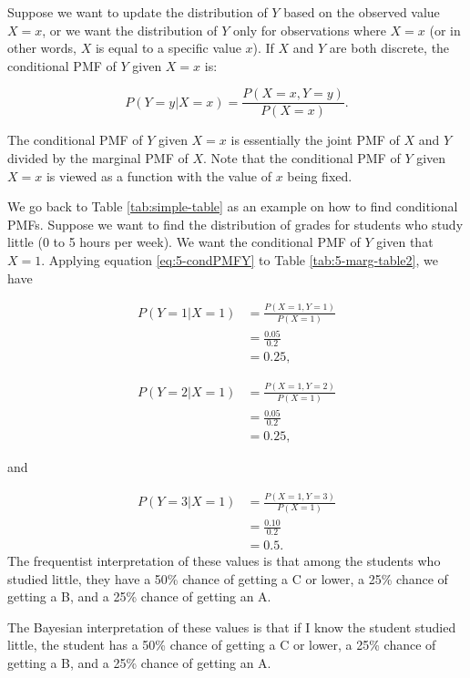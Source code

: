 \documentclass[
]{book}
\begin{document}
Suppose we want to update the distribution of \(Y\) based on the observed value \(X=x\), or we want the distribution of \(Y\) only for observations where \(X=x\) (or in other words, \(X\) is equal to a specific value \(x\)). If \(X\) and \(Y\) are both discrete, the conditional PMF of \(Y\) given \(X=x\) is:

\begin{equation} 
P(Y=y|X=x) = \frac{P(X=x, Y=y)}{P(X=x)}.
\label{eq:5-condPMFY}
\end{equation}

The conditional PMF of \(Y\) given \(X=x\) is essentially the joint PMF of \(X\) and \(Y\) divided by the marginal PMF of \(X\). Note that the conditional PMF of \(Y\) given \(X=x\) is viewed as a function with the value of \(x\) being fixed.

We go back to Table \ref{tab:simple-table} as an example on how to find conditional PMFs. Suppose we want to find the distribution of grades for students who study little (0 to 5 hours per week). We want the conditional PMF of \(Y\) given that \(X=1\). Applying equation \eqref{eq:5-condPMFY} to Table \ref{tab:5-marg-table2}, we have

\[
\begin{split}
P(Y=1|X=1) &= \frac{P(X=1, Y=1)}{P(X=1)}\\
 &= \frac{0.05}{0.2} \\
&= 0.25,
\end{split}
\]

\[
\begin{split}
P(Y=2|X=1) &= \frac{P(X=1, Y=2)}{P(X=1)}\\
 &= \frac{0.05}{0.2} \\
&= 0.25,
\end{split}
\]

and

\[
\begin{split}
P(Y=3|X=1) &= \frac{P(X=1, Y=3)}{P(X=1)}\\
 &= \frac{0.10}{0.2} \\
&= 0.5.
\end{split}
\]
The frequentist interpretation of these values is that among the students who studied little, they have a 50\% chance of getting a C or lower, a 25\% chance of getting a B, and a 25\% chance of getting an A.

The Bayesian interpretation of these values is that if I know the student studied little, the student has a 50\% chance of getting a C or lower, a 25\% chance of getting a B, and a 25\% chance of getting an A.
\end{document}
